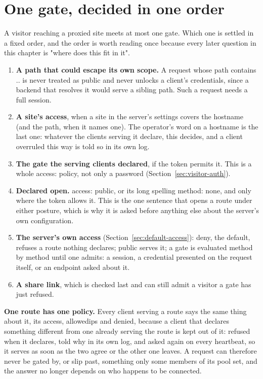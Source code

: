 \documentclass[11pt,a4paper,oneside]{book}
\newcommand{\aperiobreakableunderscore}{\textunderscore\allowbreak}
\newcommand{\aperiocodebreaks}{\XeTeXinterchartokenstate=1 }
\newcommand{\aperiocodebreaks}{}
\DeclareRobustCommand{\code}[1]{{\ttfamily\small\aperiocodebreaks
  \let\_\aperiobreakableunderscore#1}}
\begin{document}
\section{One gate, decided in one order}

A visitor reaching a proxied site meets at most one gate. Which one is
settled in a fixed order, and the order is worth reading once because
every later question in this chapter is "where does this fit in it".

\begin{enumerate}[leftmargin=1.5em]
  \item \textbf{A path that could escape its own scope.} A request whose
        path contains \code{..} is never treated as public and never
        unlocks a client's credentials, since a backend that resolves it
        would serve a sibling path. Such a request needs a full session.
  \item \textbf{A site's \code{access}}, when a site in the server's
        settings covers the hostname (and the path, when it names one).
        The operator's word on a hostname is the last one: whatever the
        clients serving it declare, this decides, and a client overruled
        this way is told so in its own log.
  \item \textbf{The gate the serving clients declared}, if the token
        permits it. This is a whole \code{access:} policy, not only a
        password (Section~\ref{sec:visitor-auth}).
  \item \textbf{Declared open.} \code{access: public}, or its long spelling
        \code{method: none}, and only where the token allows it. This is
        the one sentence that opens a route under either posture, which
        is why it is asked before anything else about the server's own
        configuration.
  \item \textbf{The server's own \code{access}}
        (Section~\ref{sec:default-access}): \code{deny}, the default,
        refuses a route nothing declares; \code{public} serves it; a gate
        is evaluated method by method until one admits: a session, a
        credential presented on the request itself, or an endpoint asked
        about it.
  \item \textbf{A share link}, which is checked last and can still admit
        a visitor a gate has just refused.
\end{enumerate}

\textbf{One route has one policy.} Every client serving a route says the
same thing about it, its \code{access}, \code{allowed\_ips} and
\code{denied}, because a client that declares something different from one
already serving the route is kept out of it: refused when it declares,
told why in its own log, and asked again on every heartbeat, so it serves
as soon as the two agree or the other one leaves. A request can therefore
never be gated by, or slip past, something only some members of its pool
set, and the answer no longer depends on who happens to be connected.
\end{document}
